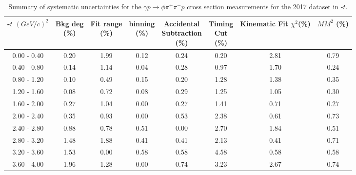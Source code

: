 \begin{table}[!htbp]
    \small
    \centering
    \caption{Summary of systematic uncertainties for the $\gamma p \rightarrow \phi \pi^{+} \pi^{-} p$ cross section measurements for the 2017 dataset in -$t$.}
    \label{tab.syserr.phi2pi.2.2}
    \begin{tabular}{|c|c|c|c|c|c|c|c|}
        \hline
        -$t$ $(GeV/c)^{2}$&\thead{Bkg deg\\(\%)}&\thead{Fit range\\(\%)}&\thead{binning\\(\%)}&\thead{Accidental\\Subtraction\\(\%)}&\thead{Timing\\Cut\\(\%)}&\thead{Kinematic\\Fit $\chi^{2}$(\%)}&\thead{$MM^{2}$\\(\%)}\\
        \hline
        0.00 - 0.40 & 0.20 & 1.99 & 0.12 & 0.24 & 0.20 & 2.81 & 0.79 \\ 
        0.40 - 0.80 & 0.14 & 1.14 & 0.04 & 0.28 & 0.97 & 1.70 & 0.24 \\ 
        0.80 - 1.20 & 0.10 & 0.49 & 0.15 & 0.20 & 1.28 & 1.38 & 0.35 \\ 
        1.20 - 1.60 & 0.08 & 0.72 & 0.08 & 0.29 & 1.25 & 1.05 & 0.30 \\ 
        1.60 - 2.00 & 0.27 & 1.04 & 0.00 & 0.27 & 1.41 & 0.71 & 0.27 \\ 
        2.00 - 2.40 & 0.35 & 0.93 & 0.00 & 0.53 & 2.38 & 0.61 & 0.73 \\ 
        2.40 - 2.80 & 0.88 & 0.78 & 0.51 & 0.00 & 2.70 & 1.84 & 0.51 \\ 
        2.80 - 3.20 & 1.48 & 1.88 & 0.41 & 0.41 & 2.13 & 0.41 & 0.71 \\ 
        3.20 - 3.60 & 1.53 & 0.00 & 0.58 & 0.58 & 4.58 & 0.58 & 0.58 \\ 
        3.60 - 4.00 & 1.96 & 1.28 & 0.00 & 0.74 & 3.23 & 2.67 & 0.74 \\
        \hline
    \end{tabular}
\end{table}

